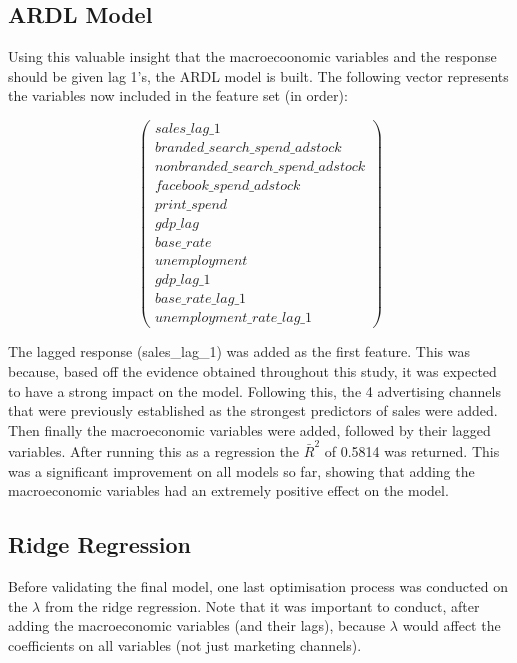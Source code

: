 \documentclass[11pt, a4paper]{article}
\begin{document}
\subsection{ARDL Model}

Using this valuable insight that the macroecoonomic variables and the response should be given lag 1’s, the ARDL model is built. The following vector represents the variables now included in the feature set (in order):  

\begin{equation}
\begin{pmatrix}
sales\_lag\_1\\
branded\_search\_spend\_adstock\\
nonbranded\_search\_spend\_adstock\\
facebook\_spend\_adstock\\
print\_spend\\
gdp\_lag\\ 
base\_rate\\ 
unemployment\\
gdp\_lag\_1\\ 
base\_rate\_lag\_1\\ 
unemployment\_rate\_lag\_1
\end{pmatrix}
\end{equation}


The lagged response (sales\_lag\_1) was added as the first feature. This was because, based off the evidence obtained throughout this study, it was expected to have a strong impact on the model. Following this, the 4 advertising channels that were previously established as the strongest predictors of sales were added. Then finally the macroeconomic variables were added, followed by their lagged variables. After running this as a regression the $\bar{R}^2$ of 0.5814 was returned. This was a significant improvement on all models so far, showing that adding the macroeconomic variables had an extremely positive effect on the model. 

\subsection{Ridge Regression}

Before validating the final model, one last optimisation process was conducted on the $\lambda$ from the ridge regression. Note that it was important to conduct, after adding the macroeconomic variables (and their lags), because $\lambda$ would affect the coefficients on all variables (not just marketing channels). 
\end{document}
